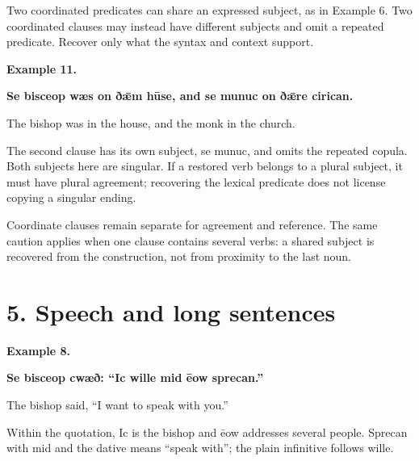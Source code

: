 Two coordinated predicates can share an expressed subject, as in Example 6. Two coordinated clauses may instead have different subjects and omit a repeated predicate. Recover only what the syntax and context support.

\textbf{Example 11.}

\textbf{Se bisceop wæs on ðǣm hūse, and se munuc on ðǣre cirican.}

The bishop was in the house, and the monk in the church.

The second clause has its own subject, se munuc, and omits the repeated copula. Both subjects here are singular. If a restored verb belongs to a plural subject, it must have plural agreement; recovering the lexical predicate does not license copying a singular ending.

Coordinate clauses remain separate for agreement and reference. The same caution applies when one clause contains several verbs: a shared subject is recovered from the construction, not from proximity to the last noun.

\section*{5. Speech and long sentences}

\textbf{Example 8.}

\textbf{Se bisceop cwæð: “Ic wille mid ēow sprecan.”}

The bishop said, “I want to speak with you.”

Within the quotation, Ic is the bishop and ēow addresses several people. Sprecan with mid and the dative means “speak with”; the plain infinitive follows wille.


